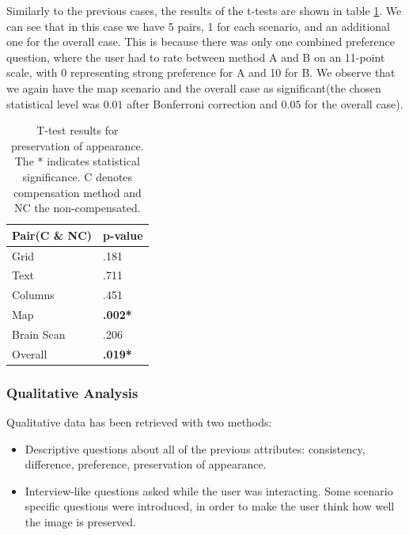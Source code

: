 \documentclass[]{article}
\begin{document}
Similarly to the previous cases, the results of the t-tests are shown in table \ref{table:Preference_Test}. We can see that in this case we have 5 pairs, 1 for each scenario, and an additional one for the overall case. This is because there was only one combined preference question, where the user had to rate between method A and B on an 11-point scale, with 0 representing strong preference for A and 10 for B. We observe that we again have the map scenario and the overall case as significant(the chosen statistical level was $0.01$ after Bonferroni correction and $0.05$ for the overall case).

\begin{table}
\begin{center}
    \begin{tabular}{ | l | l |}
    \hline
    \textbf{Pair(C \& NC)} & \textbf{p-value }\\ \hline
    Grid & .181 \\ \hline
    Text & .711 \\ \hline
    Columns & .451 \\ \hline
    Map & \textbf{.002*} \\ \hline
    Brain Scan & .206 \\ \hline
    Overall & \textbf{.019*} \\
    \hline
    \end{tabular}    
    
\end{center}
\caption{T-test results for preservation of appearance. The * indicates statistical significance. C denotes compensation method and NC the non-compensated.}
\label{table:Preference_Test}
\end{table}


\subsubsection{Qualitative Analysis}
\label{sec:QualitativeAnalysis}
Qualitative data has been retrieved with two methods: 
\begin{itemize}[noitemsep,topsep=0pt]
\item Descriptive questions about all of the previous attributes: consistency, difference, preference, preservation of appearance.
\item Interview-like questions asked while the user was interacting. Some scenario specific questions were introduced, in order to make the user think how well the image is preserved.
\end{itemize} 
\end{document}
